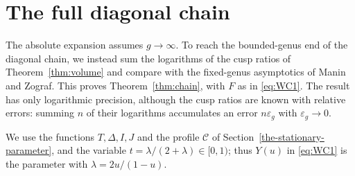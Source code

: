 \section{The full diagonal chain}\label{uniform-logarithmic-volume-rate-and-the-full-diagonal-chain}

The absolute expansion assumes $g\to\infty$. To reach the bounded-genus
end of the diagonal chain, we instead sum the logarithms of the cusp
ratios of Theorem~\ref{thm:volume} and compare with the fixed-genus
asymptotics of Manin and Zograf. This proves Theorem~\ref{thm:chain}, with
$F$ as in \eqref{eq:WC1}. The result has only logarithmic precision,
although the cusp ratios are known with relative errors: summing $n$ of
their logarithms accumulates an error $n\varepsilon_g$ with
$\varepsilon_g\to0$.

We use the functions \(T,\Delta,I,J\) and the profile \(\mathcal C\)
of Section~\ref{the-stationary-parameter}, and the variable
\(t=\lambda/(2+\lambda)\in[0,1)\); thus \(Y(u)\) in \eqref{eq:WC1} is the
parameter with \(\lambda=2u/(1-u)\).

